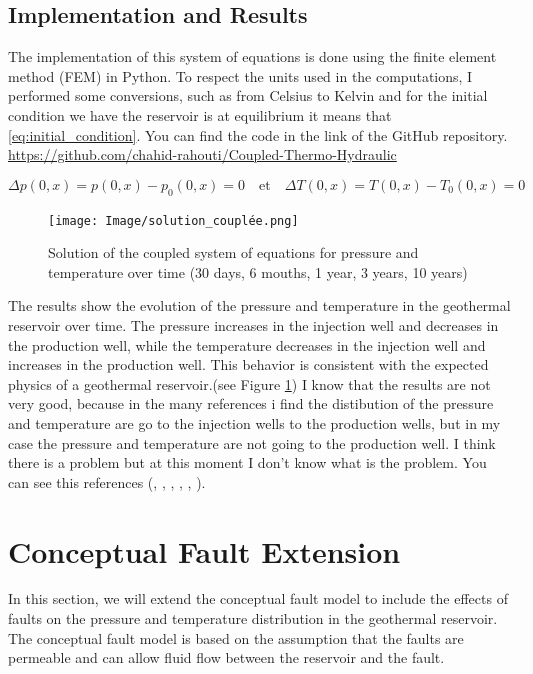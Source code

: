 \documentclass[a4paper,12pt]{report}
\begin{document}
\subsection{Implementation and Results}
The implementation of this system of equations is done using the finite 
element method (FEM) in Python. To respect the units used in the computations, I performed some conversions, such as from 
Celsius to Kelvin and for the initial condition we have the reservoir is at equilibrium it means that \ref{eq:initial_condition}. You can find the code in the link of the GitHub repository.
\href{https://github.com/chahid-rahouti/Coupled-Thermo-Hydraulic}{https://github.com/chahid-rahouti/Coupled-Thermo-Hydraulic}

\begin{equation}
\Delta p(0,x) = p(0,x) - p_0(0,x) = 0 \quad \text{et} \quad \Delta T(0,x) = T(0,x) - T_0(0,x) = 0
\label{eq:initial_condition}
\end{equation}
\begin{figure}[h!]
    \centering
        \centering
        \texttt{[image: Image/solution\_couplée.png]}
        \caption{Solution of the coupled system of equations for pressure and temperature over time (30 days, 6 mouths, 1 year, 3 years, 10 years)}
        \label{fig:results}
\end{figure}
The results show the evolution of the pressure and temperature in 
the geothermal reservoir over time. The pressure increases in 
the injection well and decreases in the production well, while the temperature 
decreases in the injection well and increases in the production well. 
This behavior is consistent with the expected physics of a geothermal reservoir.(see Figure \ref{fig:results})
I know that the results are not very good, because in the many references i find the distibution
of the pressure and temperature are go to the injection wells to the production wells, but 
in my case the pressure and temperature are not going to the production well. I think there is a problem 
but at this moment I don't know what is the problem. You can see this references (\cite{1}, \cite{2}, \cite{3}, \cite{4}, \cite{5}, \cite{6}).
\section{Conceptual Fault Extension}
In this section, we will extend the conceptual fault model to include the effects of
faults on the pressure and temperature distribution in the geothermal reservoir.
The conceptual fault model is based on the assumption that the faults are
permeable and can allow fluid flow between the reservoir and the fault. 
\end{document}
